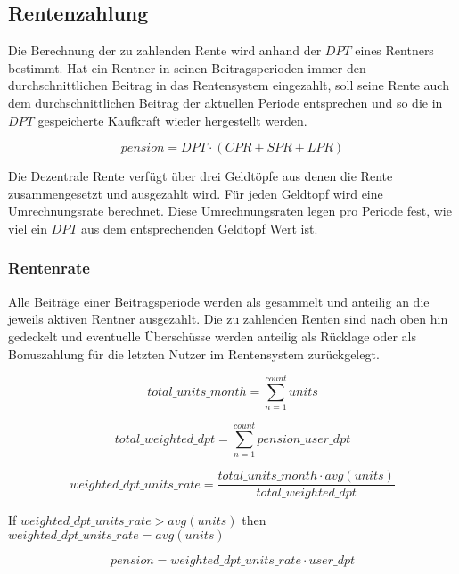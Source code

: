 \subsection{Rentenzahlung}
Die Berechnung der zu zahlenden Rente wird anhand der $DPT$ eines Rentners bestimmt.
Hat ein
Rentner in seinen Beitragsperioden immer den durchschnittlichen Beitrag in das
Rentensystem eingezahlt, soll seine
Rente auch dem durchschnittlichen Beitrag der aktuellen
Periode entsprechen und so die in $DPT$ gespeicherte Kaufkraft wieder hergestellt werden.

\begin{equation}
pension = DPT \cdot (CPR + SPR + LPR)
\end{equation}

Die Dezentrale Rente verfügt über drei Geldtöpfe aus denen die Rente zusammengesetzt und 
ausgezahlt wird. Für jeden Geldtopf wird eine Umrechnungsrate berechnet. Diese
Umrechnungsraten legen pro Periode fest, wie viel ein $DPT$ aus dem entsprechenden
Geldtopf Wert ist.

\subsubsection*{Rentenrate}
Alle Beiträge einer Beitragsperiode werden als gesammelt und anteilig an die jeweils aktiven Rentner ausgezahlt.
Die zu zahlenden Renten sind nach oben hin gedeckelt und eventuelle Überschüsse werden
anteilig als Rücklage oder als Bonuszahlung für die letzten Nutzer im Rentensystem
zurückgelegt. 

\begin{equation}
	total\_units\_month = 
	\sum_{n=1}^{count} units
\end{equation}

\begin{equation}
	total\_weighted\_dpt = 
	\sum_{n=1}^{count} pension\_user\_dpt
\end{equation}

\begin{equation}
	weighted\_dpt\_units\_rate = 	
	\frac{total\_units\_month  \cdot avg(units)} 
	{total\_weighted\_dpt}		
\end{equation}

If $weighted\_dpt\_units\_rate > avg(units)$ then $weighted\_dpt\_units\_rate = avg(units)$
        

\begin{equation}
	pension = 	
	weighted\_dpt\_units\_rate \cdot user\_dpt
\end{equation}


